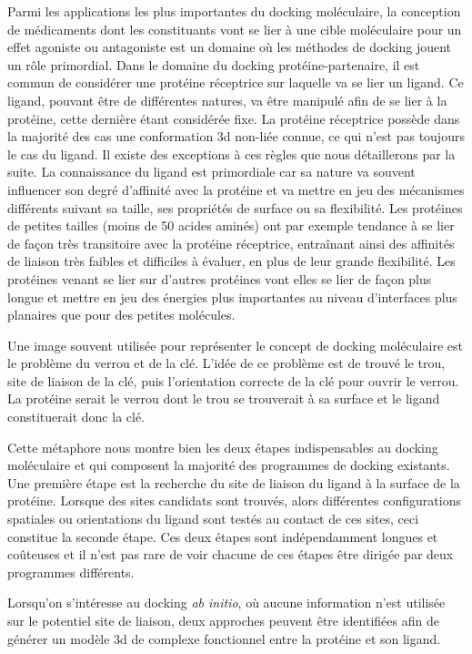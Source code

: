 Parmi les applications les plus importantes du docking moléculaire, la conception de médicaments dont les constituants vont se lier à une cible moléculaire pour un effet agoniste ou antagoniste est un domaine où les méthodes de docking jouent un rôle primordial.
Dans le domaine du docking protéine-partenaire, il est commun de considérer une protéine réceptrice sur laquelle va se lier un ligand. Ce ligand, pouvant être de différentes natures, va être manipulé afin de se lier à la protéine, cette dernière étant considérée fixe. La protéine réceptrice possède dans la majorité des cas une conformation 3d non-liée connue, ce qui n'est pas toujours le cas du ligand. Il existe des exceptions à ces règles que nous détaillerons par la suite. La connaissance du ligand est primordiale car sa nature va souvent influencer son degré d'affinité avec la protéine et va mettre en jeu des mécanismes différents suivant sa taille, ses propriétés de surface ou sa flexibilité. Les protéines de petites tailles (moins de 50 acides aminés) ont par exemple tendance à se lier de façon très transitoire avec la protéine réceptrice, entraînant ainsi des affinités de liaison très faibles et difficiles à évaluer, en plus de leur grande flexibilité. Les protéines venant se lier sur d'autres protéines vont elles se lier de façon plus longue et mettre en jeu des énergies plus importantes au niveau d'interfaces plus planaires que pour des petites molécules.

Une image souvent utilisée pour représenter le concept de docking moléculaire est le problème du verrou et de la clé. L'idée de ce problème est de trouvé le trou, site de liaison de la clé, puis l'orientation correcte de la clé pour ouvrir le verrou. La protéine serait le verrou dont le trou se trouverait à sa surface et le ligand constituerait donc la clé.

Cette métaphore nous montre bien les deux étapes indispensables au docking moléculaire et qui composent la majorité des programmes de docking existants. Une première étape est la recherche du site de liaison du ligand à la surface de la protéine. Lorsque des sites candidats sont trouvés, alors différentes configurations spatiales ou orientations du ligand sont testés au contact de ces sites, ceci constitue la seconde étape. Ces deux étapes sont indépendamment longues et coûteuses et il n'est pas rare de voir chacune de ces étapes être dirigée par deux programmes différents.

Lorsqu'on s'intéresse au docking \textit{ab initio}, où aucune information n'est utilisée sur le potentiel site de liaison, deux approches peuvent être identifiées afin de générer un modèle 3d de complexe fonctionnel entre la protéine et son ligand.

